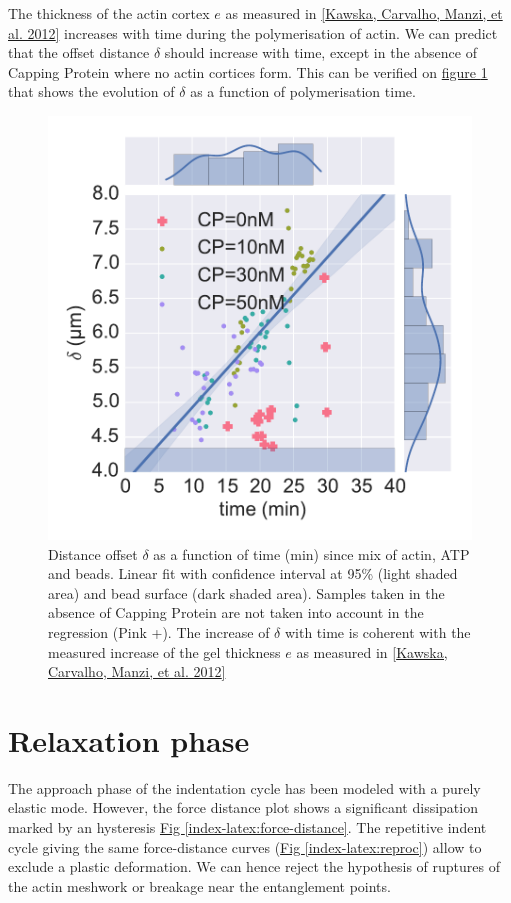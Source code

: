 \documentclass[A4paperpaper,11pt,english]{sphinxmanual}
\begin{document}
The thickness of the actin cortex \(e\) as measured in {\hyperref[index-latex:kawska2012]{{[}Kawska, Carvalho, Manzi,  et al.  2012{]}}}
increases with time during the polymerisation of actin. We can predict that the
offset distance \(\delta\) should increase with time, except in the absence of
Capping Protein where no actin cortices form. This can be verified on
\hyperref[index-latex:time-delta-corr]{figure  \ref*{index-latex:time-delta-corr}} that shows the evolution of \(\delta\) as a function
of polymerisation time.
\begin{figure}[htbp]
\centering
\capstart

\includegraphics[width=0.900\linewidth]{time-delta-corr.pdf}
\caption{Distance offset \(\delta\) as a function of time (min) since mix of actin, ATP
and beads. Linear fit with confidence interval at 95\% (light shaded area)
and bead surface (dark shaded area). Samples taken in the absence of Capping
Protein are not taken into account in the regression (Pink +). The increase
of \(\delta\) with time is coherent with the measured increase of the gel
thickness \(e\) as measured in {\hyperref[index-latex:kawska2012]{{[}Kawska, Carvalho, Manzi,  et al.  2012{]}}}}\label{index-latex:time-delta-corr}\end{figure}


\section{Relaxation phase}
\label{index-latex:id29}
The approach phase of the indentation cycle has been modeled with a purely
elastic mode. However, the force distance plot shows a significant dissipation
marked by an hysteresis \hyperref[index-latex:force-distance]{Fig  \ref*{index-latex:force-distance}}. The repetitive indent cycle giving the same
force-distance curves (\hyperref[index-latex:reproc]{Fig  \ref*{index-latex:reproc}}) allow to exclude a plastic deformation.
We can hence reject the hypothesis of ruptures of the
actin meshwork or breakage near the entanglement points.
\end{document}

